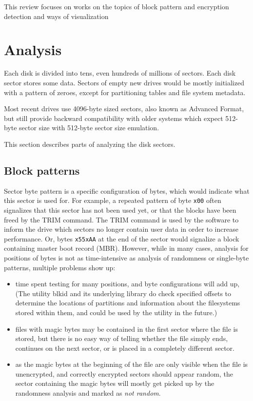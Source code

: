 \documentclass[
  digital, %
  color,   %
  oneside, %
  lof,     %
  nolot,     %
]{fithesis4}
\begin{document}
This review focuses on works on the topics of block pattern and encryption detection and ways of visualization

\section{Analysis}
\label{sec:analysis}

Each disk is divided into tens, even hundreds of millions of sectors.
Each disk sector stores some data.
Sectors of empty new drives would be mostly initialized with a pattern of zeroes, except for partitioning tables and file system metadata.

Most recent drives use 4096-byte sized sectors, also known as Advanced Format, but still provide backward compatibility with older systems which expect 512-byte sector size with 512-byte sector size emulation.\cite{seagate} 

This section describes parts of analyzing the disk sectors.

\subsection{Block patterns}
\label{ssec:block-analysis}

Sector byte pattern is a specific configuration of bytes, which would indicate what this sector is used for.
For example, a repeated pattern of byte \texttt{x00} often signalizes that this sector has not been used yet, or that the blocks have been freed by the TRIM command.
The TRIM command is used by the software to inform the drive which sectors no longer contain user data in order to increase performance.\cite{mcmillen21}
Or, bytes \texttt{x55xAA} at the end of the sector would signalize a block containing master boot record (MBR).
However, while in many cases, analysis for positions of bytes is not as time-intensive as analysis of randomness or single-byte patterns, multiple problems show up:
\begin{itemize}
    \item time spent testing for many positions, and byte configurations will add up,
    (The utility blkid\cite{blkid} and its underlying library\cite{libblkid} do check specified offsets to determine the locations of partitions and information about the filesystems stored within them, and could be used by the utility in the future.)
    \item files with magic bytes may be contained in the first sector where the file is stored, but there is no easy way of telling whether the file simply ends, continues on the next sector, or is placed in a completely different sector.
    \item as the magic bytes at the beginning of the file are only visible when the file is unencrypted, and correctly encrypted sectors should appear random, the sector containing the magic bytes will mostly get picked up by the randomness analysis and marked as \emph{not random}. 
\end{itemize}
\end{document}
